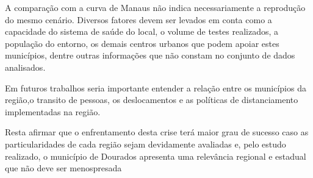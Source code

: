 \documentclass[12pt]{article}
\begin{document}
A comparação com a curva de Manaus não indica necessariamente a reprodução do mesmo cenário. Diversos fatores devem ser levados em conta como a capacidade do sistema de saúde do local, o volume de testes realizados, a população do entorno, os demais centros urbanos que podem apoiar estes municípios, dentre outras informações que não constam no conjunto de dados analisados.

Em futuros trabalhos seria importante entender a relação entre os municípios da região,o transito de pessoas, os deslocamentos e as políticas de distanciamento implementadas na região.

Resta afirmar que o enfrentamento desta crise terá maior grau de sucesso caso as particularidades de cada região sejam devidamente avaliadas e, pelo estudo realizado, o município de Dourados apresenta uma relevância regional e estadual que não deve ser menospresada



\end{document}
